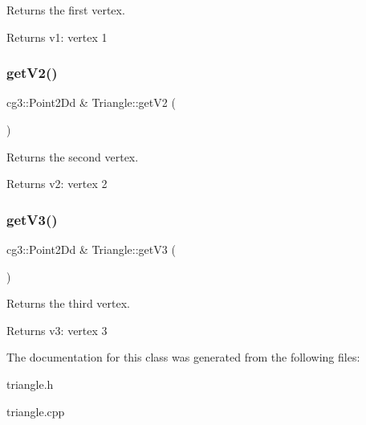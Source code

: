 Returns the first vertex. 

\begin{DoxyReturn}{Returns}
v1\+: vertex 1 
\end{DoxyReturn}
\mbox{\label{classTriangle_ae1d2450565f168c8c18d17a6c726f8e8}} 
\subsubsection{\texorpdfstring{get\+V2()}{getV2()}}
{\footnotesize\ttfamily cg3\+::\+Point2\+Dd \& Triangle\+::get\+V2 (\begin{DoxyParamCaption}{ }\end{DoxyParamCaption})}



Returns the second vertex. 

\begin{DoxyReturn}{Returns}
v2\+: vertex 2 
\end{DoxyReturn}
\mbox{\label{classTriangle_aa5b85443932443cf6b035c56af82aad8}} 
\subsubsection{\texorpdfstring{get\+V3()}{getV3()}}
{\footnotesize\ttfamily cg3\+::\+Point2\+Dd \& Triangle\+::get\+V3 (\begin{DoxyParamCaption}{ }\end{DoxyParamCaption})}



Returns the third vertex. 

\begin{DoxyReturn}{Returns}
v3\+: vertex 3 
\end{DoxyReturn}


The documentation for this class was generated from the following files\+:\begin{DoxyCompactItemize}
\item 
triangle.\+h\item 
triangle.\+cpp\end{DoxyCompactItemize}
